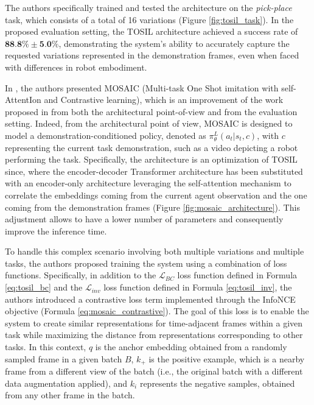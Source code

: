 The authors specifically trained and tested the architecture on the \textit{pick-place} task, which consists of a total of 16 variations (Figure \ref{fig:tosil_task}). In the proposed evaluation setting, the TOSIL architecture achieved a success rate of $\textbf{88.8}\% \pm \textbf{5.0}\%$, demonstrating the system's ability to accurately capture the requested variations represented in the demonstration frames, even when faced with differences in robot embodiment.


In \cite{mandi2022towards_more_generalizable_one_shot}, the authors presented MOSAIC (Multi-task One Shot imitation with self-AttentIon and Contrastive learning), which is an improvement of the work proposed in \cite{dasari2021transformers_one_shot} from both the architectural point-of-view and from the evaluation setting.
Indeed, from the architectural point of view, MOSAIC is designed to model a demonstration-conditioned policy, denoted as $\pi^{L}_{\theta}(a_{t}|s_{t},c)$, with $c$ representing the current task demonstration, such as a video depicting a robot performing the task. Specifically, the architecture is an optimization of TOSIL since, where the encoder-decoder Transformer architecture has been substituted with an encoder-only architecture leveraging the self-attention mechanism to correlate the embeddings coming from the current agent observation and the one coming from the demonstration frames (Figure \ref{fig:mosaic_architecture}). This adjustment allows to have a lower number of parameters and consequently improve the inference time. 


To handle this complex scenario involving both multiple variations and multiple tasks, the authors proposed training the system using a combination of loss functions. Specifically, in addition to the $\mathcal{L}_{BC}$ loss function defined in Formula \ref{eq:tosil_bc} and the $\mathcal{L}_{inv}$ loss function defined in Formula \ref{eq:tosil_inv}, the authors introduced a contrastive loss term implemented through the InfoNCE objective (Formula \ref{eq:mosaic_contrastive}). The goal of this loss is to enable the system to create similar representations for time-adjacent frames within a given task while maximizing the distance from representations corresponding to other tasks. In this context, $q$ is the anchor embedding obtained from a randomly sampled frame in a given batch $B$, $k_{+}$ is the positive example, which is a nearby frame from a different view of the batch (i.e., the original batch with a different data augmentation applied), and $k_{i}$ represents the negative samples, obtained from any other frame in the batch.

